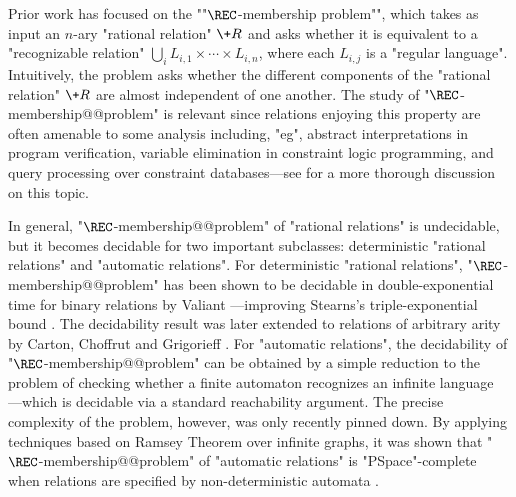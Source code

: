 Prior work has focused on the ""$\REC$-membership problem"", 
which takes as input an $n$-ary "rational relation"%
$\+R$ and asks whether it is equivalent to a "recognizable relation"
$\bigcup_i L_{i,1} \times \cdots \times L_{i,n}$, where each $L_{i,j}$ is a "regular language". 
Intuitively, the problem asks whether the different components of  
the "rational relation" $\+R$ are almost independent of one another.
The study of "$\REC$-membership@@problem"
is relevant since relations enjoying this property are often amenable to some analysis including,
"eg", abstract interpretations in program verification, variable elimination in constraint logic 
programming, and query processing over constraint databases---see \cite[Introduction]{BarceloHongLeLinNiskanen2019MonadicDecomposability} for a more thorough discussion on this topic.

In general, "$\REC$-membership@@problem" of "rational relations" is undecidable, but it becomes decidable 
for two important subclasses: 
deterministic "rational relations" and "automatic relations". 
For deterministic "rational relations",  "$\REC$-membership@@problem" has been shown to be decidable in 
double-exponential time for binary relations
by Valiant \cite{Valiant1975RegularityDeterministicPushdown}---improving Stearns's
triple-exponential bound \cite{Stearns1967RegularityPushdown}.
The decidability result was later extended to relations of arbitrary arity by Carton, Choffrut and 
Grigorieff \cite[Theorem 3.7]{CartonChoffrutGrigorieff2006DecisionProblems}.
For "automatic relations", the decidability of "$\REC$-membership@@problem"
can be obtained by a  simple reduction to the problem of checking whether a finite automaton 
recognizes an infinite language \cite{LodingSpinrath2019DecisionProblems}---which is decidable via 
a standard reachability argument. 
The precise complexity of the problem, however, was only recently pinned down.
By applying techniques based on Ramsey Theorem over infinite graphs, it was shown that 
"$\REC$-membership@@problem" of "automatic relations" is 
"PSpace"-complete when relations are specified by non-deterministic automata
\cite[Theorem 1]{BarceloHongLeLinNiskanen2019MonadicDecomposability} \cite[Corollary 2.9]{BergstrasserGanardiLinZetzsche2022RamseyQuantifiers}.

